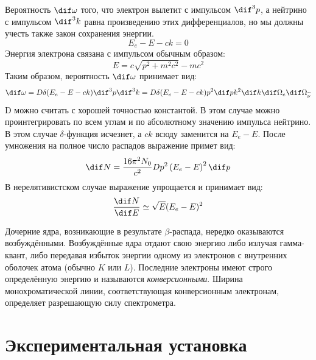 \documentclass[a4paper]{article}
\begin{document}
		Вероятность $\dif\omega$ того, что электрон вылетит с импульсом $\dif^3p$, а нейтрино с импульсом $\dif^3k$ равна произведению этих дифференциалов, но мы должны учесть также закон сохранения энергии.
		\begin{equation}
		    E_e - E - ck = 0
		\end{equation}
		Энергия электрона связана с импульсом обычным образом:
		\begin{equation}
		    E = c\sqrt{p^2 + m^2c^2} -mc^2
		\end{equation}
		Таким образом, вероятность $\dif\omega$ принимает вид:
		\begin{equation}
		    \dif\omega = D\delta(E_e-E-ck)\dif^3p\dif^3k = D\delta(E_e-E-ck)p^2\dif pk^2\dif k\dif\Omega_e\dif\Omega_{\widetilde{\nu}}
		\end{equation}
		D можно считать с хорошей точностью константой. В этом случае можно проинтегрировать по всем углам и по абсолютному значению импульса нейтрино. В этом случае $\delta$-функция исчезнет, а $ck$ всюду заменится на $E_e-E$. После умножения на полное число распадов выражение примет вид:
		\begin{equation}
		    \dif N = \frac{16\pi^2N_0}{c^2} D p^2\left(E_e-E\right)^2\dif p
		\end{equation}
		В нерелятивистском случае выражение упрощается и принимает вид:
		\begin{equation}
			\frac{\dif N}{\dif E} \simeq \sqrt{E}(E_e - E)^2
		\end{equation}
		
		Дочерние ядра, возникающие в результате $\beta$-распада, нередко оказываются возбуждёнными. Возбуждённые ядра отдают свою энергию либо излучая гамма-квант, либо передавая избыток энергии одному из электронов с внутренних оболочек атома (обычно $K$ или $L$). Последние электроны имеют строго определённую энергию и называются \textit{конверсионными}. Ширина монохроматической линии, соответствующая конверсионным электронам, определяет разрешающую силу спектрометра.

\section{Экспериментальная установка}
\end{document}
